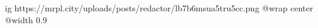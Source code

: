  
 
 
 
 

\ifcmt
  ig https://mrpl.city/uploads/posts/redactor/lb7b6msua5tru5cc.png
  @wrap center
  @width 0.9
\fi
